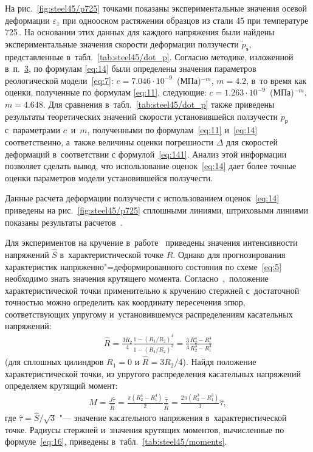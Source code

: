 \begin{table}[b!]
\vspace{-1mm}

\end{table}




На рис.~\ref{fig:steel45/p725}  точками показаны экспериментальные значения осевой деформации $\varepsilon_z$ при одноосном растяжении образцов из стали 45 при температуре 725\,\textcelsius \cite [рис.~5] {Banschikova}. 
На основании этих данных для каждого напряжения были найдены экспериментальные значения скорости деформации ползучести $\dot{p}_\text{э}$, представленные в~табл.~\ref{tab:steel45/dot_p}. 
Согласно методике, изложенной в~п.~\hyperlink{ts:3}{3}, по формулам \eqref{eq:14} были определены значения параметров реологической модели~\eqref{eq:7}: $c=7.046 \cdot 10^{-9}$~(МПа)$^{-m}$, $m=4.2$, в~то время как оценки, полученные по формулам \eqref{eq:11}, следующие: $c=1.263 \cdot 10^{-9}$~(МПа)$^{-m}$, $m=4.648$.
Для сравнения в~табл.~\ref{tab:steel45/dot_p} также приведены результаты теоретических значений скорости установившейся ползучести $\dot{p}_\text{р}$ с~параметрами $c$~и~$m$, полученными по формулам~\eqref{eq:11} и~\eqref{eq:14} соответственно, а~также величины оценки погрешности $\Delta$ для 
скоростей деформаций в~соответствии с формулой~\eqref{eq:141}. 
Анализ этой информации позволяет сделать вывод, что использование оценок~\eqref{eq:14} дает более точные оценки параметров модели установившейся ползучести.  

Данные расчета деформации ползучести с использованием оценок~\eqref{eq:14} приведены на рис.~\ref{fig:steel45/p725} сплошными линиями, штриховыми линиями показаны результаты расчетов~\cite{Banschikova}.



Для экспериментов на кручение в~работе~\cite{Banschikova} приведены значения интенсивности напряжений $\hat{S}$ в~характеристической точке $\hat{R}$. 
Однако для прогнозирования характеристик напряженно"=деформированного состояния по схеме~\eqref{eq:5} необходимо знать значения крутящего момента.
Согласно~\cite{Gorev},~положение характеристической точки применительно к кручению стержней с~достаточной точностью можно определить как координату пересечения эпюр, соответствующих упругому и~установившемуся распределениям касательных напряжений: 
\begin{gather} \label{eq:15}
 	\hat{R} = \frac{3R_2}{4} \frac{1-\left(R_1 / R_2 \right)^4}{1-\left(R_1 / R_2 \right)^3} = \frac{3}{4} \frac{R_2^4-R_1^4}{R_2^3-R_1^3}
\end{gather}
(для сплошных цилиндров $R_1=0$ и $\hat{R}=3R_2/4$).
Найдя положение характеристической точки, из упругого распределения касательных напряжений определяем крутящий момент:
\begin{gather} \label{eq:16}
 	M = \frac{J \hat{\tau}}{\hat{R}} = \frac{\pi (R_2^4-R_1^4)}{2} \frac{\hat{\tau}}{\hat{R}}= \frac{2 \pi (R_2^3-R_1^3)}{3} \hat{\tau},
\end{gather}
где $\hat{\tau}=\hat{S} / \sqrt{3}$ "--- значение касательного напряжения в~характеристической точке.
Радиусы стержней и~значения крутящих моментов, вычисленные по формуле~\eqref{eq:16}, приведены в~табл.~\ref{tab:steel45/moments}. 

